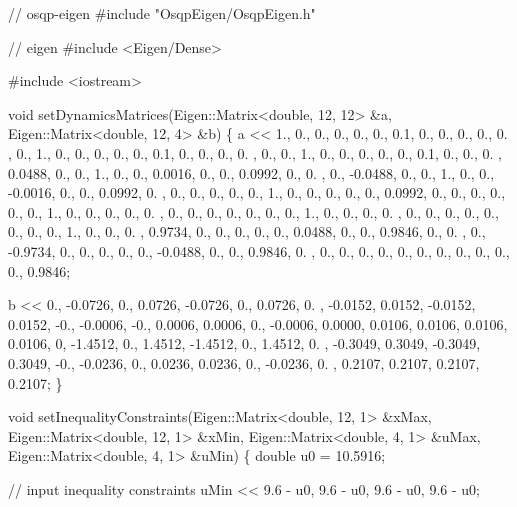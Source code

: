 \begin{DoxyCodeInclude}

\textcolor{comment}{// osqp-eigen}
\textcolor{preprocessor}{#include "OsqpEigen/OsqpEigen.h"}

\textcolor{comment}{// eigen}
\textcolor{preprocessor}{#include <Eigen/Dense>}

\textcolor{preprocessor}{#include <iostream>}

\textcolor{keywordtype}{void} setDynamicsMatrices(Eigen::Matrix<double, 12, 12> &a, Eigen::Matrix<double, 12, 4> &b)
\{
    a << 1.,      0.,     0., 0., 0., 0., 0.1,     0.,     0.,  0.,     0.,     0.    ,
        0.,      1.,     0., 0., 0., 0., 0.,      0.1,    0.,  0.,     0.,     0.    ,
        0.,      0.,     1., 0., 0., 0., 0.,      0.,     0.1, 0.,     0.,     0.    ,
        0.0488,  0.,     0., 1., 0., 0., 0.0016,  0.,     0.,  0.0992, 0.,     0.    ,
        0.,     -0.0488, 0., 0., 1., 0., 0.,     -0.0016, 0.,  0.,     0.0992, 0.    ,
        0.,      0.,     0., 0., 0., 1., 0.,      0.,     0.,  0.,     0.,     0.0992,
        0.,      0.,     0., 0., 0., 0., 1.,      0.,     0.,  0.,     0.,     0.    ,
        0.,      0.,     0., 0., 0., 0., 0.,      1.,     0.,  0.,     0.,     0.    ,
        0.,      0.,     0., 0., 0., 0., 0.,      0.,     1.,  0.,     0.,     0.    ,
        0.9734,  0.,     0., 0., 0., 0., 0.0488,  0.,     0.,  0.9846, 0.,     0.    ,
        0.,     -0.9734, 0., 0., 0., 0., 0.,     -0.0488, 0.,  0.,     0.9846, 0.    ,
        0.,      0.,     0., 0., 0., 0., 0.,      0.,     0.,  0.,     0.,     0.9846;

    b << 0.,      -0.0726,  0.,     0.0726,
        -0.0726,  0.,      0.0726, 0.    ,
        -0.0152,  0.0152, -0.0152, 0.0152,
        -0.,     -0.0006, -0.,     0.0006,
        0.0006,   0.,     -0.0006, 0.0000,
        0.0106,   0.0106,  0.0106, 0.0106,
        0,       -1.4512,  0.,     1.4512,
        -1.4512,  0.,      1.4512, 0.    ,
        -0.3049,  0.3049, -0.3049, 0.3049,
        -0.,     -0.0236,  0.,     0.0236,
        0.0236,   0.,     -0.0236, 0.    ,
        0.2107,   0.2107,  0.2107, 0.2107;
\}


\textcolor{keywordtype}{void} setInequalityConstraints(Eigen::Matrix<double, 12, 1> &xMax, Eigen::Matrix<double, 12, 1> &xMin,
                              Eigen::Matrix<double, 4, 1> &uMax, Eigen::Matrix<double, 4, 1> &uMin)
\{
    \textcolor{keywordtype}{double} u0 = 10.5916;

    \textcolor{comment}{// input inequality constraints}
    uMin << 9.6 - u0,
        9.6 - u0,
        9.6 - u0,
        9.6 - u0;


\end{DoxyCodeInclude}
